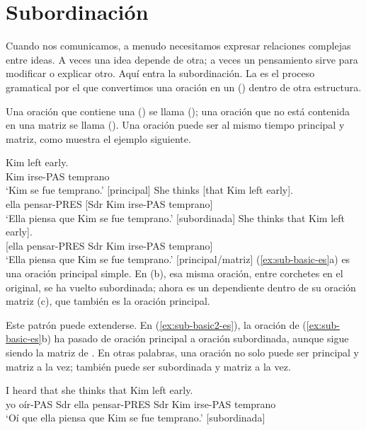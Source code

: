 \section{Subordinación}\label{sec:subordination-es}

Cuando nos comunicamos, a menudo necesitamos expresar relaciones complejas entre ideas. A veces una idea depende de otra; a veces un pensamiento sirve para modificar o explicar otro. Aquí entra la subordinación. La  es el proceso gramatical por el que convertimos una oración en un  () dentro de otra estructura.

Una oración que contiene una  () se llama  (); una oración que no está contenida en una matriz se llama  (). Una oración puede ser al mismo tiempo principal y matriz, como muestra el ejemplo siguiente.

\ea \label{ex:sub-basic-es}
    \ea \gll Kim left early.\\
        Kim irse-PAS temprano\\
    \glt `Kim se fue temprano.' [principal]
    \ex \gll She thinks {[}that Kim left early{]}.\\
        ella pensar-PRES {[}Sdr Kim irse-PAS temprano{]}\\
    \glt `Ella piensa que Kim se fue temprano.' [subordinada]
    \ex \gll {[}She thinks that Kim left early{]}.\\
        {[}ella pensar-PRES Sdr Kim irse-PAS temprano{]}\\
    \glt `Ella piensa que Kim se fue temprano.' [principal/matriz]
    \z
\z
(\ref{ex:sub-basic-es}a) es una oración principal simple. En (b), esa misma oración, entre corchetes en el original, se ha vuelto subordinada; ahora es un dependiente dentro de su oración matriz (c), que también es la oración principal.

Este patrón puede extenderse. En (\ref{ex:sub-basic2-es}), la oración de (\ref{ex:sub-basic-es}b) ha pasado de oración principal a oración subordinada, aunque sigue siendo la matriz de . En otras palabras, una oración no solo puede ser principal y matriz a la vez; también puede ser subordinada y matriz a la vez.

\ea\label{ex:sub-basic2-es}
\gll I heard {\ob}that she thinks {\ob}that Kim left early{\cb}{\cb}.\\
    yo oír-PAS Sdr ella pensar-PRES Sdr Kim irse-PAS temprano\\
\glt `Oí que ella piensa que Kim se fue temprano.' [subordinada]
\z

